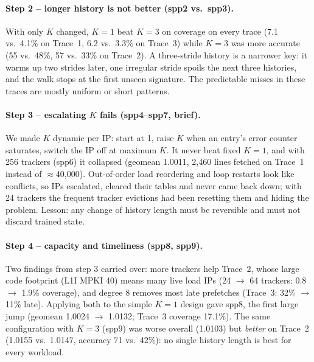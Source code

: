 \documentclass[12pt, a4paper]{article}
\begin{document}
\paragraph{Step 2 -- longer history is not better (spp2 vs.\ spp3).} With only
$K$ changed, $K=1$ beat $K=3$ on coverage on every trace (7.1 vs.\ 4.1\% on
Trace~1, 6.2 vs.\ 3.3\% on Trace~3) while $K=3$ was more accurate (55 vs.\ 48\%,
57 vs.\ 33\% on Trace~2). A three-stride history is a narrower key: it warms up
two strides later, one irregular stride spoils the next three histories, and
the walk stops at the first unseen signature. The predictable misses in these
traces are mostly uniform or short patterns.

\paragraph{Step 3 -- escalating $K$ fails (spp4--spp7, brief).} We made $K$
dynamic per IP: start at 1, raise $K$ when an entry's error counter saturates,
switch the IP off at maximum $K$. It never beat fixed $K=1$, and with 256
trackers (spp6) it collapsed (geomean 1.0011, 2{,}460 lines fetched on Trace~1
instead of $\approx$40{,}000). Out-of-order load reordering and loop restarts
look like conflicts, so IPs escalated, cleared their tables and never came
back down; with 24 trackers the frequent tracker evictions had been resetting
them and hiding the problem. Lesson: any change of history length must be
reversible and must not discard trained state.

\paragraph{Step 4 -- capacity and timeliness (spp8, spp9).} Two findings from
step 3 carried over: more trackers help Trace~2, whose large code footprint
(L1I MPKI 40) means many live load IPs (24 $\to$ 64 trackers: 0.8 $\to$ 1.9\%
coverage), and degree 8 removes most late prefetches (Trace~3: 32\% $\to$ 11\%
late). Applying both to the simple $K=1$ design gave spp8, the first large jump
(geomean 1.0024 $\to$ 1.0132; Trace~3 coverage 17.1\%). The same configuration
with $K=3$ (spp9) was worse overall (1.0103) but \emph{better} on Trace~2
(1.0155 vs.\ 1.0147, accuracy 71 vs.\ 42\%): no single history length is best
for every workload.
\end{document}

